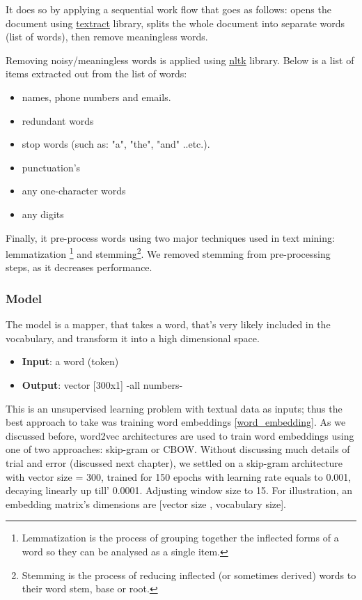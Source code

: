 It does so by applying a sequential work flow that goes as follows: opens the document using \href{https://textract.readthedocs.io/en/stable/}{\underline{textract}} library, splits the whole document into separate words (list of words), then remove meaningless words.

Removing noisy/meaningless words is applied using \href{https://www.nltk.org/}{\underline{nltk}} library. Below is a list of items extracted out from the list of words:

\begin{itemize}
    \item names, phone numbers and emails.
    \item redundant words
    \item stop words (such as: "a", "the", "and" ..etc.).
    \item punctuation's
    \item any one-character words
    \item any digits
\end{itemize}

Finally, it pre-process words using two major techniques used in text mining: lemmatization \footnote{Lemmatization is the process of grouping together the inflected forms of a word so they can be analysed as a single item.} and stemming\footnote{Stemming is the process of reducing inflected (or sometimes derived) words to their word stem, base or root.}. We removed stemming from pre-processing steps, as it decreases performance.

\subsubsection{Model}
The model is a mapper, that takes a word, that's very likely included in the vocabulary, and transform it into a high dimensional space.

\begin{itemize}
    \item \textbf{Input}: a word (token)
    \item \textbf{Output}: vector [300x1] -all numbers-
\end{itemize}

This is an unsupervised learning problem with textual data as inputs; thus the best approach to take was training word embeddings \ref{word_embedding}. As we discussed before, word2vec architectures are used to train word embeddings using one of two approaches: skip-gram or CBOW. Without discussing much details of trial and error (discussed next chapter), we settled on a skip-gram architecture with vector size = 300, trained for 150 epochs with learning rate equals to 0.001, decaying linearly up till' 0.0001. Adjusting window size to 15. For illustration, an embedding matrix's dimensions are [vector size , vocabulary size].\\

